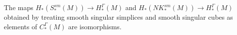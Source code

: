 \begin{theorem}\label{T: hom iso map}
	The maps $H_*(S^{sm}_*(M)) \to H_*^\Gamma(M)$ and $H_*(NK^{sm}_*(M)) \to H_*^\Gamma(M)$ obtained by treating smooth singular simplices and smooth singular cubes as elements of $C_*^\Gamma(M)$ are isomorphisms.
\end{theorem}

